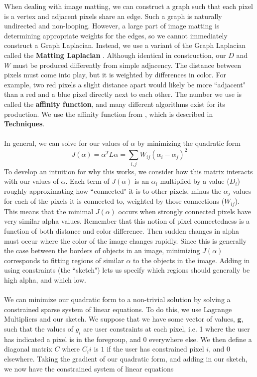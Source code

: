 When dealing with image matting, we can construct a graph such that each pixel is a vertex and adjacent pixels share an edge. Such a graph is naturally undirected and non-looping. However, a large part of image matting is determining appropriate weights for the edges, so we cannot immediately construct a Graph Laplacian. Instead, we use a variant of the Graph Laplacian called the \textbf{Matting Laplacian} \cite{levin08}.
Although identical in construction, our $D$ and $W$ must be produced differently from simple adjacency. The distance between pixels must come into play, but it is weighted by differences in color. For example, two red pixels a slight distance apart would likely be more ``adjacent" than a red and a blue pixel directly next to each other. The number we use is called the \textbf{affinity function}, and many different algorithms exist for its production. We use the affinity function from \cite{levin08}, which is described in \textbf{Techniques}.
\\\\
In general, we can solve for our values of $\alpha$ by minimizing the quadratic form
\[J(\alpha)=\alpha^T L\alpha=\sum_{i,j}W_{ij}(\alpha_i-\alpha_j)^2\]
To develop an intuition for why this works, we consider how this matrix interacts with our values of $\alpha$. Each term of $J(\alpha)$ is an $\alpha_i$ multiplied by a value ($D_i$) roughly approximating how ``connected" it is to other pixels, minus the $\alpha_j$ values for each of the pixels it is connected to, weighted by those connections ($W_{ij}$). This means that the minimal $J(\alpha)$ occurs when strongly connected pixels have very similar alpha values. Remember that this notion of pixel connectedness is a function of both distance and color difference. Then sudden changes in alpha must occur where the color of the image changes rapidly. Since this is generally the case between the borders of objects in an image, minimizing $J(\alpha)$ corresponds to fitting regions of similar $\alpha$ to the objects in the image. Adding in using constraints (the ``sketch") lets us specify which regions should generally be high alpha, and which low.
\\\\
We can minimize our quadratic form to a non-trivial solution by solving a constrained sparse system of linear equations.  To do this, we use Lagrange Multipliers and our sketch.
We suppose that we have some vector of values, $\textbf{g}$, such that the values of $g_i$ are user constraints at each pixel, i.e. 1 where the user has indicated a pixel is in the foregroup, and 0 everywhere else. We then define a diagonal matrix $C$ where $C_ii$ is $1$ if the user has constrained pixel $i$, and $0$ elsewhere. Taking the gradient of our quadratic form, and adding in our sketch, we now have the constrained system of linear equations
